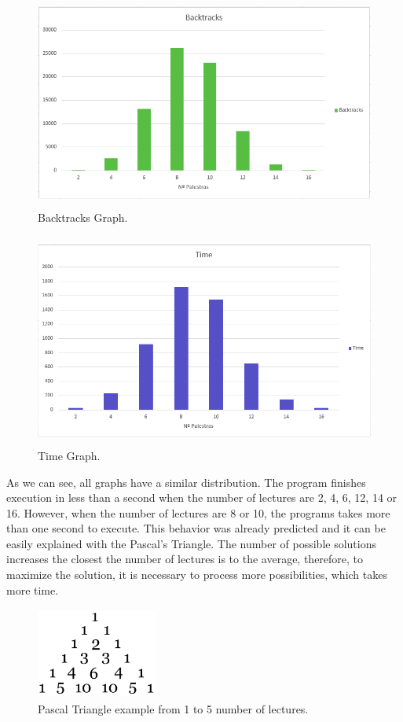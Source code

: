 \documentclass[runningheads,a4paper]{llncs}
\begin{document}
\begin{figure}[!h]
\centering
\includegraphics[width=11.5cm,height=7cm]{Backtracks}
\caption{Backtracks Graph.}
\label{fig:Graph1}
\end{figure}

\begin{figure}[!h]
\centering
\includegraphics[width=11.5cm,height=7cm]{Time}
\caption{Time Graph.}
\label{fig:Graph1}
\end{figure}

\clearpage
As we can see, all graphs have a similar distribution. The program finishes execution in less than a second when the number of lectures are  2, 4, 6, 12, 14 or 16. However, when the number of lectures are 8 or 10, the programs takes more than one second to execute. This behavior was already predicted and it can be easily explained with the Pascal's Triangle. The number of possible solutions increases the closest the number of lectures is to the average, therefore, to maximize the solution, it is necessary to process more possibilities, which takes more time.

\begin{figure}[!h]
\centering
\includegraphics[width=4cm,height=3cm]{Pascal}
\caption{Pascal Triangle example from 1 to 5 number of lectures.}
\label{fig:Graph1}
\end{figure}
\end{document}
